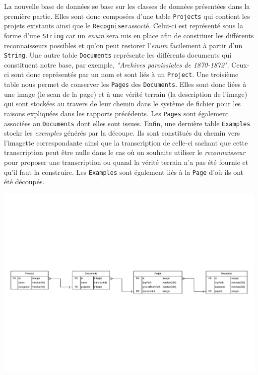 La nouvelle base de données se base sur les classes de données présentées dans la première partie. Elles sont donc composées d'une table \texttt{Projects} qui contient les projets existants ainsi que le \texttt{Recogniser}associé. Celui-ci est représenté sous la forme d'une \texttt{String} car un \textit{enum} sera mis en place afin de constituer les différents reconnaisseurs possibles et qu'on peut restorer l'\textit{enum} facilement à partir d'un \texttt{String}. Une autre table \texttt{Documents} représente les différents documents qui constituent notre base, par exemple, \textit{"Archives paroissiales de 1870-1872"}. Ceux-ci sont donc représentés par un nom et sont liés à un \texttt{Project}. Une troisième table nous permet de conserver les \texttt{Pages} des \texttt{Documents}. Elles sont donc liées à une image (le scan de la page) et à une vérité terrain (la description de l'image) qui sont stockées au travers de leur chemin dans le système de fichier pour les raisons expliquées dans les rapports précédents. Les \texttt{Pages} sont également associées au \texttt{Documents} dont elles sont issues. Enfin, une dernière table \texttt{Examples} stocke les \textit{exemples} générés par la découpe. Ils sont constitués du chemin vers l'imagette correspondante ainsi que la transcription de celle-ci sachant que cette transcription peut être nulle dans le cas où on souhaite utiliser le \textit{reconnaisseur} pour proposer une transcription ou quand la vérité terrain n'a pas été fournie et qu'il faut la construire. Les \texttt{Examples} sont également liés à la \texttt{Page} d'où ils ont été découpés.

\begin{mdframed}[frametitle={Structure de la base de données}, innerbottommargin=10]
\begin{center}
\includegraphics[scale=0.5]{assets/DatabaseEntity.pdf}
\end{center}
\end{mdframed}


